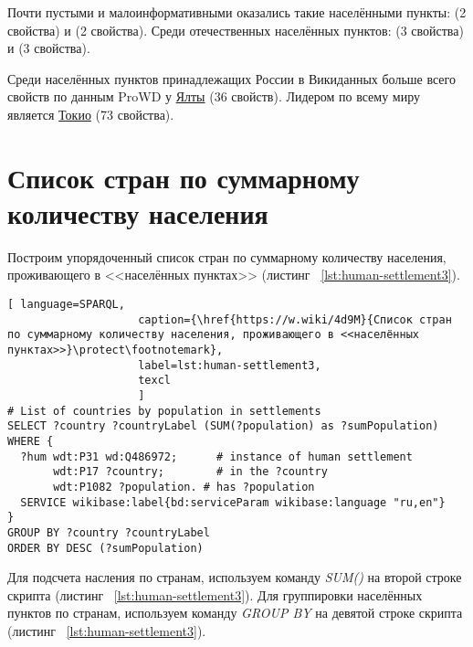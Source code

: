 Почти пустыми и малоинформативными оказались такие населёнными пункты:  (2 свойства) и  (2 свойства). Среди отечественных населённых пунктов:  (3 свойства) и  (3 свойства).

Среди населённых пунктов принадлежащих России в Викиданных больше всего свойств по данным ProWD у \href{http://www.wikidata.org/entity/Q128499}{Ялты} (36 свойств). Лидером по всему миру является \href{http://www.wikidata.org/entity/Q1490}{Токио} (73 свойства)\autocite{humansettlements_ProWD}.

\section{Список стран по суммарному количеству населения}

Построим упорядоченный список стран по суммарному количеству населения, проживающего в <<населённых пунктах>> (листинг ~\protect\ref{lst:human-settlement3}).

\lstset{numbers=left, firstnumber=1, frame=single}
\begin{lstlisting}[ language=SPARQL, 
                    caption={\href{https://w.wiki/4d9M}{Список стран по суммарному количеству населения, проживающего в <<населённых пунктах>>}\protect\footnotemark},
                    label=lst:human-settlement3,
                    texcl 
                    ]
# List of countries by population in settlements
SELECT ?country ?countryLabel (SUM(?population) as ?sumPopulation)
WHERE {
  ?hum wdt:P31 wd:Q486972;  	# instance of human settlement
       wdt:P17 ?country;    	# in the ?country
       wdt:P1082 ?population. # has ?population
  SERVICE wikibase:label{bd:serviceParam wikibase:language "ru,en"}
}
GROUP BY ?country ?countryLabel 
ORDER BY DESC (?sumPopulation)
\end{lstlisting}%

Для подсчета насления по странам, используем команду \textit{SUM()} на второй строке скрипта (листинг ~\protect\ref{lst:human-settlement3}). Для группировки населённых пунктов по странам, используем команду \textit{GROUP BY} на девятой строке скрипта (листинг ~\protect\ref{lst:human-settlement3}).

